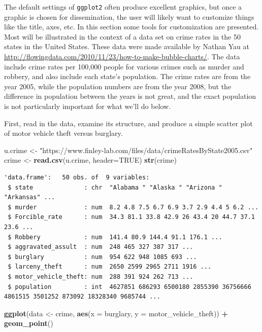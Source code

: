 \documentclass[
]{krantz}
\makeatletter
\newenvironment{Shaded}{\begin{snugshade}}{\end{snugshade}}
\newcommand{\DataTypeTok}[1]{\textcolor[rgb]{0.27,0.27,0.27}{#1}}
\newcommand{\KeywordTok}[1]{\textcolor[rgb]{0.27,0.27,0.27}{\textbf{#1}}}
\newcommand{\NormalTok}[1]{#1}
\newcommand{\OperatorTok}[1]{\textcolor[rgb]{0.43,0.43,0.43}{\textbf{#1}}}
\newcommand{\OtherTok}[1]{\textcolor[rgb]{0.37,0.37,0.37}{#1}}
\newcommand{\StringTok}[1]{\textcolor[rgb]{0.5,0.5,0.5}{#1}}
\newenvironment{kframe}{%
\medskip{}
\setlength{\fboxsep}{.8em}
 \def\at@end@of@kframe{}%
 \ifinner\ifhmode%
  \def\at@end@of@kframe{\end{minipage}}%
  \begin{minipage}{\columnwidth}%
 \fi\fi%
 \def\FrameCommand##1{\hskip\@totalleftmargin \hskip-\fboxsep
 \colorbox{shadecolor}{##1}\hskip-\fboxsep
     \hskip-\linewidth \hskip-\@totalleftmargin \hskip\columnwidth}%
 \MakeFramed {\advance\hsize-\width
   \@totalleftmargin\z@ \linewidth\hsize
   \@setminipage}}%
 {\par\unskip\endMakeFramed%
 \at@end@of@kframe}
\renewenvironment{Shaded}{\begin{kframe}}{\end{kframe}}
\makeatother
\begin{document}
The default settings of \texttt{ggplot2} often produce excellent graphics, but once a graphic is chosen for dissemination, the user will likely want to customize things like the title, axes, etc. In this section some tools for customization are presented. Most will be illustrated in the context of a data set on crime rates in the 50 states in the United States. These data were made available by Nathan Yau at \url{http://flowingdata.com/2010/11/23/how-to-make-bubble-charts/}. The data include crime rates per 100,000 people for various crimes such as murder and robbery, and also include each state's population. The crime rates are from the year 2005, while the population numbers are from the year 2008, but the difference in population between the years is not great, and the exact population is not particularly important for what we'll do below.

First, read in the data, examine its structure, and produce a simple scatter plot of motor vehicle theft versus burglary.

\begin{Shaded}
\begin{Highlighting}[]
\NormalTok{u.crime \textless{}{-}}\StringTok{ "https://www.finley{-}lab.com/files/data/crimeRatesByState2005.csv"}
\NormalTok{crime \textless{}{-}}\StringTok{ }\KeywordTok{read.csv}\NormalTok{(u.crime, }\DataTypeTok{header=}\OtherTok{TRUE}\NormalTok{)}
\KeywordTok{str}\NormalTok{(crime)}
\end{Highlighting}
\end{Shaded}

\begin{verbatim}
'data.frame':	50 obs. of  9 variables:
 $ state              : chr  "Alabama " "Alaska " "Arizona " "Arkansas" ...
 $ murder             : num  8.2 4.8 7.5 6.7 6.9 3.7 2.9 4.4 5 6.2 ...
 $ Forcible_rate      : num  34.3 81.1 33.8 42.9 26 43.4 20 44.7 37.1 23.6 ...
 $ Robbery            : num  141.4 80.9 144.4 91.1 176.1 ...
 $ aggravated_assult  : num  248 465 327 387 317 ...
 $ burglary           : num  954 622 948 1085 693 ...
 $ larceny_theft      : num  2650 2599 2965 2711 1916 ...
 $ motor_vehicle_theft: num  288 391 924 262 713 ...
 $ population         : int  4627851 686293 6500180 2855390 36756666 4861515 3501252 873092 18328340 9685744 ...
\end{verbatim}

\begin{Shaded}
\begin{Highlighting}[]
\KeywordTok{ggplot}\NormalTok{(data \textless{}{-}}\StringTok{ }\NormalTok{crime, }\KeywordTok{aes}\NormalTok{(}\DataTypeTok{x =}\NormalTok{ burglary, }\DataTypeTok{y =}\NormalTok{ motor\_vehicle\_theft)) }\OperatorTok{+}\StringTok{ }
\StringTok{    }\KeywordTok{geom\_point}\NormalTok{()}
\end{Highlighting}
\end{Shaded}
\end{document}
